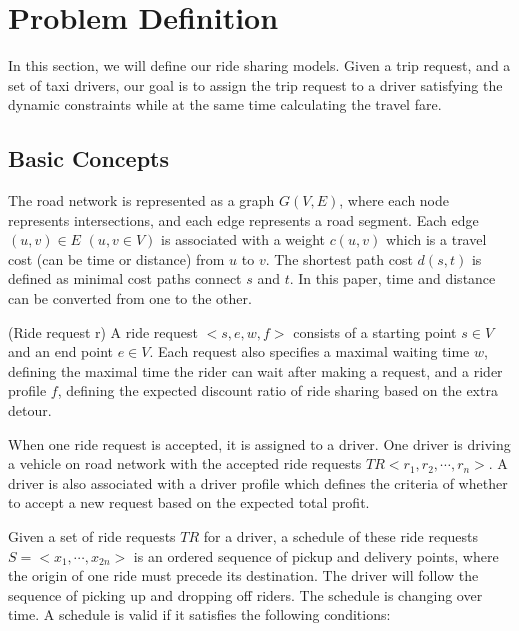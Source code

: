 \section{Problem Definition}

In this section, we will define our ride sharing models. Given a trip request, and a set of taxi drivers, our goal is to assign the trip request to a driver satisfying the dynamic constraints while at the same time calculating the travel fare. 

\subsection{Basic Concepts}
The road network is represented as a graph $G(V, E)$, where each node represents intersections, and each edge represents a road segment. 
Each edge $(u,v) \in E$ $(u, v \in V)$ is associated with a weight $c(u,v)$ which is a travel cost (can be time or distance) from $u$ to $v$.
The shortest path cost $d(s,t)$ is defined as minimal cost paths connect $s$ and $t$. In this paper, time and distance can be converted from one to the other.

\begin{definition}
(Ride request r) A ride request $<s, e, w, f>$ consists of a starting point $s \in V$ and an end point $e \in V$. Each request also specifies a maximal waiting time $w$, defining the maximal time the rider can wait after making a request, and a rider profile $f$, defining the expected discount ratio of ride sharing based on the extra detour.
\end{definition}

When one ride request is accepted, it is assigned to a driver. One driver is driving a vehicle on road network with the accepted ride requests $TR<r_1, r_2, \cdots, r_n>$. A driver is also associated with a driver profile which defines the criteria of whether to accept a new request based on the expected total profit.

Given a set of ride requests $TR$ for a driver, a schedule of these ride requests $S=<x_1, \cdots, x_{2n}>$ is an ordered sequence of pickup and delivery points, where the origin of one ride must precede its destination. The driver will follow the sequence of picking up and dropping off riders. The schedule is changing over time. A schedule is valid if it satisfies the following conditions:


